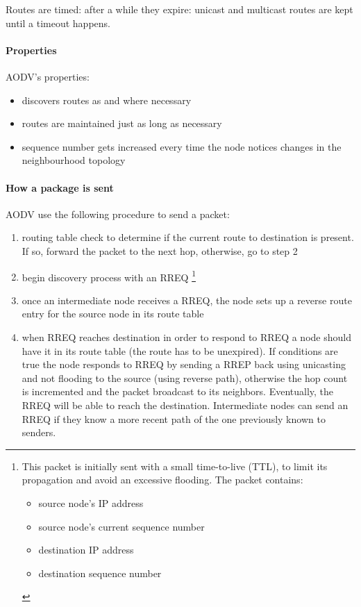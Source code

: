 Routes are timed: after a while they expire: unicast and multicast routes are
kept until a timeout happens.

\paragraph*{Properties} AODV's properties:
\begin{itemize}
\item discovers routes as and where necessary
\item routes are maintained just as long as necessary
\item sequence number gets increased every time the node notices changes in the neighbourhood topology
\end{itemize}

\paragraph*{How a package is sent} AODV use the following procedure to send a
packet:
\begin{enumerate}
\item routing table check to determine if the current route to destination is
  present. If so, forward the packet to the next hop, otherwise, go to step 2
\item begin discovery process with an RREQ \footnote{
  This packet is initially sent with a small time-to-live (TTL), to limit its
  propagation and avoid an excessive flooding.
  The packet contains:
  \begin{itemize}
  \item source node's IP address
  \item source node's current sequence number
  \item destination IP address
  \item destination sequence number
  \end{itemize}
}
\item once an intermediate node receives a RREQ, the node sets up a reverse
  route entry for the source node in its route table
\item when RREQ reaches destination in order to respond to RREQ a node should
  have it in its route table (the route has to be unexpired). If conditions are
  true the node responds to RREQ by sending a RREP back using unicasting
  and not flooding to the source (using reverse path), otherwise the hop count
  is incremented and the packet broadcast to its neighbors. Eventually, the
  RREQ will be able to reach the destination. Intermediate nodes can send an
  RREQ if they know a more recent path of the one previously known to senders.
\end{enumerate}

